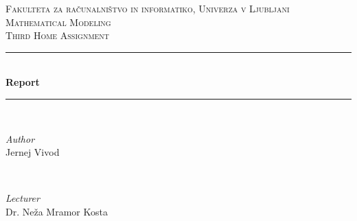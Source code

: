 \documentclass[fleqn]{article}
\begin{document}
\begin{titlepage} %
	\newcommand{\HRule}{\rule{\linewidth}{0.5mm}} %
	
	\center %
	
	
	\textsc{\LARGE Fakulteta za računalništvo in informatiko, Univerza v Ljubljani}\\[1.5cm] %
	
	\textsc{\Large Mathematical Modeling}\\[0.5cm] %
	
	\textsc{\large Third Home Assignment}\\[0.5cm] %
	
	
	\HRule\\[0.4cm]
	
	{\huge\bfseries Report}\\[0.4cm] %
	
	\HRule\\[1.5cm]
	
	
	\begin{minipage}{0.4\textwidth}
		\begin{flushleft}
			\large
			\textit{Author}\\
			Jernej Vivod %
		\end{flushleft}
	\end{minipage}
	~
	\begin{minipage}{0.4\textwidth}
		\begin{flushright}
			\large
			\textit{Lecturer}\\
			Dr. Neža Mramor Kosta
		\end{flushright}
	\end{minipage}
	
	

\end{titlepage}
\end{document}
